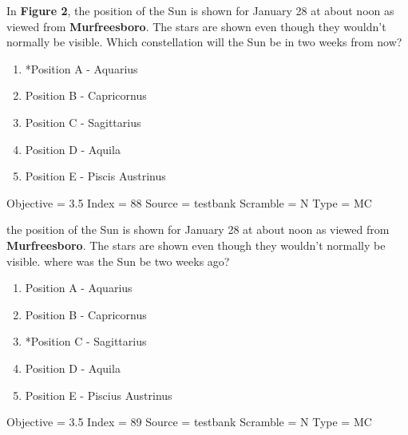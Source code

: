 \documentclass[11pt]{article}
\begin{document}
\begin{enumerate}
\begin{minipage}{\textwidth}
\begin{minipage}{\textwidth}
\item In {\bf Figure 2}, the position of the Sun is shown for January 28 at about noon as viewed from {\bf Murfreesboro}.  The stars are shown even though they wouldn't normally be visible.  Which constellation will the Sun be in two weeks from now?
\begin{multicols}{2}
\begin{enumerate} 
\setlength{\itemsep}{1pt} 
\setlength{\parskip}{0pt} 
\setlength{\parsep}{0pt}
\setlength{\multicolsep}{1pt} 
\item *Position A - Aquarius
\item Position B - Capricornus
\item Position C - Sagittarius
\item Position D - Aquila
\item Position E - Piscis Austrinus
\end{enumerate} 
\vfill 
\end{multicols}

Objective = 3.5
Index = 88
Source = testbank
Scramble = N
Type = MC
\end{minipage}
\end{minipage}
\vskip 0.20in

\begin{minipage}{\textwidth}
\begin{minipage}{\textwidth}
\item the position of the Sun is shown for January 28 at about noon as viewed from {\bf Murfreesboro}.  The stars are shown even though they wouldn't normally be visible. where was the Sun be two weeks ago?
\begin{multicols}{2}
\begin{enumerate} 
\setlength{\itemsep}{1pt} 
\setlength{\parskip}{0pt} 
\setlength{\parsep}{0pt}
\setlength{\multicolsep}{1pt} 
\item Position A - Aquarius
\item Position B - Capricornus
\item *Position C - Sagittarius
\item Position D - Aquila
\item Position E - Piscius Austrinus
\end{enumerate} 
\vfill 
\end{multicols}

Objective = 3.5
Index = 89
Source = testbank
Scramble = N
Type = MC
\end{minipage}
\end{minipage}
\vskip 0.20in


\end{enumerate}
\end{document}
